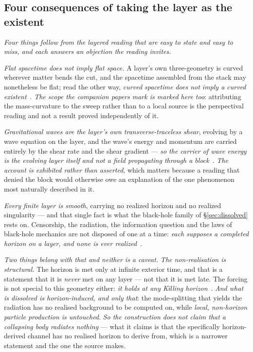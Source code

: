 \documentclass[11pt,a4paper]{article}
\theoremstyle{plain}
\theoremstyle{definition}
\begin{document}
\subsection{Four consequences of taking the layer as the existent}

\emph{Four things follow from the layered reading that are easy to state and easy to miss, and each answers
an objection the reading invites.}

\emph{Flat spacetime does not imply flat space.} A layer's own three-geometry is curved wherever matter
bends the cut, and the spacetime assembled from the stack may nonetheless be flat; read the other way,
\emph{curved spacetime does not imply a curved existent}~\cite{JanzenCRframework}. \emph{The scope the
companion papers mark is marked here too}: attributing the mass-curvature to the sweep rather than to a local
source is the perspectival reading and not a result proved independently of it.

\emph{Gravitational waves are the layer's own transverse-traceless shear}, evolving by a wave equation on the
layer, and the wave's energy and momentum are carried entirely by the shear rate and the shear gradient
--- \emph{so the carrier of wave energy is the evolving layer itself and not a field propagating through a
block}~\cite{JanzenCRframework}. \emph{The account is exhibited rather than asserted}, which matters because
a reading that denied the block would otherwise owe an explanation of the one phenomenon most naturally
described in it.

\emph{Every finite layer is smooth}, carrying no realized horizon and no realized singularity --- and that
single fact is what the black-hole family of \S\ref{sec:dissolved} rests on. Censorship, the radiation, the
information question and the laws of black-hole mechanics are not disposed of one at a
time: \emph{each supposes a completed horizon on a layer, and none is ever
realized}~\cite{JanzenCRframework}.

\emph{Two things belong with that and neither is a caveat.} \emph{The non-realisation is structural.} The
horizon is met only at infinite exterior time, and that is a statement that it is \emph{never} met on any
layer --- not that it is met late. The forcing is not special to this geometry either: \emph{it holds at any
Killing horizon}~\cite{JanzenBHcausality}. \emph{And what is dissolved is horizon-induced, and only that}: the
mode-splitting that yields the radiation has no realised background to be computed on, while
\emph{local, non-horizon particle production is untouched}. \emph{So the construction does not claim that a
collapsing body radiates nothing} --- what it claims is that the specifically horizon-derived channel has no
realised horizon to derive from, which is a narrower statement and the one the source makes.
\end{document}
